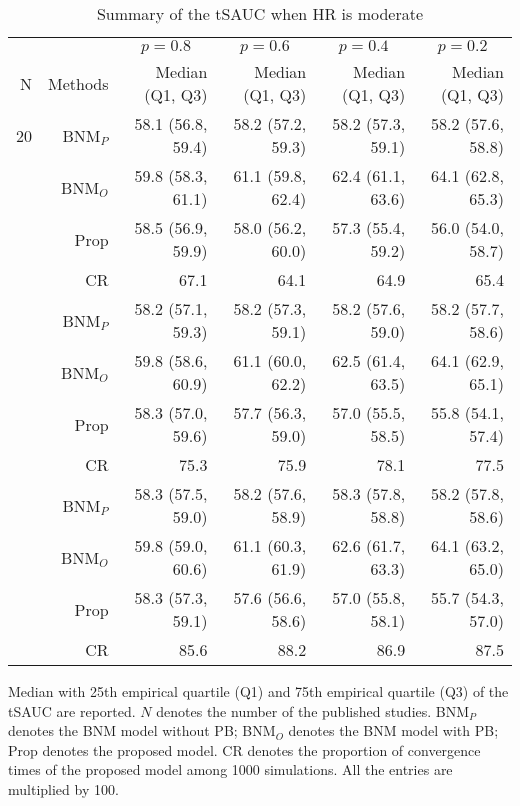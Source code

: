 \begin{table}[!htb]

\caption{\label{tab:sauc.med.2}Summary of the tSAUC when HR is moderate}
\centering
\begin{threeparttable}
\begin{tabular}[t]{rrrrrr}
\toprule
\multicolumn{1}{c}{} & \multicolumn{1}{c}{} & \multicolumn{1}{c}{$p = 0.8$} & \multicolumn{1}{c}{$p = 0.6$} & \multicolumn{1}{c}{$p = 0.4$} & \multicolumn{1}{c}{$p = 0.2$} \\
\cmidrule(l{3pt}r{3pt}){3-3} \cmidrule(l{3pt}r{3pt}){4-4} \cmidrule(l{3pt}r{3pt}){5-5} \cmidrule(l{3pt}r{3pt}){6-6}
N & Methods & Median (Q1, Q3) & Median (Q1, Q3) & Median (Q1, Q3) & Median (Q1, Q3)\\
\midrule
20 & BNM$_P$ & 58.1 (56.8, 59.4) & 58.2 (57.2, 59.3) & 58.2 (57.3, 59.1) & 58.2 (57.6, 58.8)\\
 & BNM$_O$ & 59.8 (58.3, 61.1) & 61.1 (59.8, 62.4) & 62.4 (61.1, 63.6) & 64.1 (62.8, 65.3)\\
 & Prop & 58.5 (56.9, 59.9) & 58.0 (56.2, 60.0) & 57.3 (55.4, 59.2) & 56.0 (54.0, 58.7)\\
 & CR & 67.1 & 64.1 & 64.9 & 65.4\\
\addlinespace
30 & BNM$_P$ & 58.2 (57.1, 59.3) & 58.2 (57.3, 59.1) & 58.2 (57.6, 59.0) & 58.2 (57.7, 58.6)\\
 & BNM$_O$ & 59.8 (58.6, 60.9) & 61.1 (60.0, 62.2) & 62.5 (61.4, 63.5) & 64.1 (62.9, 65.1)\\
 & Prop & 58.3 (57.0, 59.6) & 57.7 (56.3, 59.0) & 57.0 (55.5, 58.5) & 55.8 (54.1, 57.4)\\
 & CR & 75.3 & 75.9 & 78.1 & 77.5\\
\addlinespace
50 & BNM$_P$ & 58.3 (57.5, 59.0) & 58.2 (57.6, 58.9) & 58.3 (57.8, 58.8) & 58.2 (57.8, 58.6)\\
 & BNM$_O$ & 59.8 (59.0, 60.6) & 61.1 (60.3, 61.9) & 62.6 (61.7, 63.3) & 64.1 (63.2, 65.0)\\
 & Prop & 58.3 (57.3, 59.1) & 57.6 (56.6, 58.6) & 57.0 (55.8, 58.1) & 55.7 (54.3, 57.0)\\
 & CR & 85.6 & 88.2 & 86.9 & 87.5\\
\bottomrule
\end{tabular}
\begin{tablenotes}
\item 
Median with 25th empirical quartile (Q1) and 75th empirical quartile (Q3) of the tSAUC are reported. 
$N$ denotes the number of the published studies. 
BNM$_P$ denotes the BNM model without PB; 
BNM$_O$ denotes the BNM model with PB;
Prop denotes the proposed model.
CR denotes the proportion of convergence times of the proposed model among 1000 simulations.
All the entries are multiplied by 100.
\end{tablenotes}
\end{threeparttable}
\end{table}
